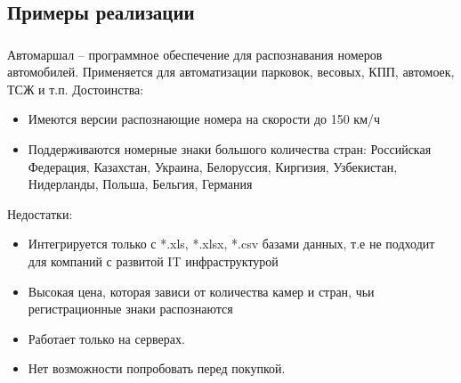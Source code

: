 \subsection{Примеры реализации}
\label{sub:domain:realization}

\subsubsection{}
\label{sub:domain:realization:automarshal}
Автомаршал – программное обеспечение для распознавания номеров автомобилей. Применяется для автоматизации парковок, весовых, КПП, автомоек, ТСЖ и т.п.\cite{auto_marshal}
Достоинства:
\begin{itemize}
  \item Имеются версии распознающие номера на скорости до 150 км/ч
  \item Поддерживаются номерные знаки большого количества стран: Российская Федерация, Казахстан, Украина, Белоруссия, Киргизия, Узбекистан, Нидерланды, Польша, Бельгия, Германия
\end{itemize}
Недостатки:
\begin{itemize}
  \item Интегрируется только с *.xls, *.xlsx, *.csv базами данных, т.е не подходит для компаний с развитой IT инфраструктурой
  \item Высокая цена, которая зависи от количества камер и стран, чьи регистрационные знаки распознаются
  \item Работает только на \windows{} серверах.
  \item Нет возможности попробовать перед покупкой.
\end{itemize}

